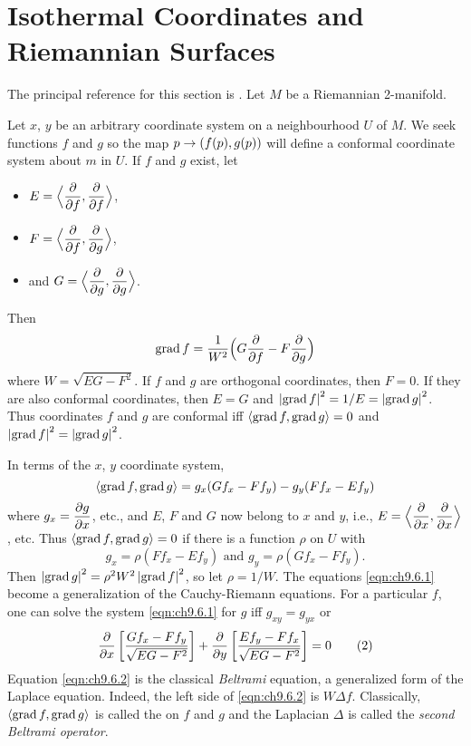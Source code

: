 \documentclass[../main]{subfiles}
\begin{document}
\section{Isothermal Coordinates and Riemannian Surfaces}\label{ch09:s6}

The principal reference for this section is  \cite{samelson1955differential}. Let $M$ be a Riemannian 2-manifold. 

Let $x$, $y$ be an arbitrary coordinate system on a neighbourhood $U$ of $M$. We seek functions $f$ and $g$ so the map $p \to (f(p), g(p))$ will define a conformal coordinate system about $m$ in $U$. If $f$ and $g$ exist, let 
\begin{itemize}
    \item $E = \Big\langle \dfrac{\partial }{\partial f},\dfrac{\partial }{\partial f}\Big\rangle$, 
    \item $F = \Big\langle \dfrac{\partial }{\partial f}, \dfrac{\partial }{\partial g}\Big\rangle$,
    \item and $G = \Big\langle \dfrac{\partial }{\partial g},\dfrac{\partial }{\partial g}\Big\rangle$. 
\end{itemize}
 Then \[\operatorname{grad} f = \dfrac{1}{W^2}\Big(G\dfrac{\partial }{\partial f} - F\dfrac{\partial }{\partial g}\Big)\]
 where $W = \sqrt{EG - F^2}$. If $f$ and $g$ are orthogonal coordinates, then $F=0$. If they are also conformal coordinates, then $E=G$ and $\left|\operatorname{grad} f\right|^2 = 1/E = \left|\operatorname{grad} g\right|^2$. Thus coordinates $f$ and $g$ are conformal iff $\left\langle\operatorname{grad}{f},\operatorname{grad}{g}\right\rangle = 0$ and $\left|\operatorname{grad} f\right|^2 = \left|\operatorname{grad} g\right|^2$.

In terms of the $x$, $y$ coordinate system, \[\left\langle\operatorname{grad} f,\operatorname{grad} g\right\rangle = g_x(Gf_x - Ff_y) - g_y(Ff_x - Ef_y)\] where $g_x = \dfrac{\partial g}{\partial x}$, etc., and $E$, $F$ and $G$ now belong to $x$ and $y$, i.e., $E = \Big\langle \dfrac{\partial }{\partial x},\dfrac{\partial }{\partial x}\Big\rangle$, etc. Thus $\left\langle\operatorname{grad} f,\operatorname{grad} g\right\rangle = 0$ if there is a function $\rho$ on $U$ with 
\begin{equation}
    g_x = \rho(Ff_x-Ef_y) \text{ and } g_y = \rho(Gf_x - Ff_y).\tag{1}\label{eqn:ch9.6.1}
\end{equation}
Then $\left|\operatorname{grad}{g}\right|^2 = \rho^2 W^2\left|\operatorname{grad} f\right|^2$, so let $\rho = 1/W$. The equations \eqref{eqn:ch9.6.1} become a generalization of the Cauchy-Riemann equations. For a particular $f$, one can solve the system \eqref{eqn:ch9.6.1} for $g$ iff $g_{xy} = g_{yx}$ or
\begin{equation}
    \dfrac{\partial }{\partial x}\left[\frac{Gf_x - Ff_y}{\sqrt{EG - F^2}}\right] + \dfrac{\partial }{\partial y}\left[\frac{Ef_y - Ff_x}{\sqrt{EG-F^2}}\right] = 0\tag{2}\label{eqn:ch9.6.2}
\end{equation}
Equation \eqref{eqn:ch9.6.2} is the classical \emph{Beltrami} equation, a generalized form of the Laplace equation. Indeed, the left side of \eqref{eqn:ch9.6.2} is $W\Delta f$. Classically, $\left\langle\operatorname{grad} f,\operatorname{grad} g\right\rangle$ is called the  on $f$ and $g$ and the Laplacian $\Delta$ is called the \emph{second Beltrami operator}. 
\end{document}
